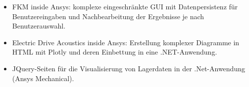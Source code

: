 \documentclass[10pt,a4paper,ragged2e,withhyper]{altacv}
\begin{document}
\begin{paracol}{2}
\begin{itemize}

\item FKM inside Ansys: komplexe eingeschränkte GUI mit Datenpersistenz für Benutzereingaben und Nachbearbeitung der Ergebnisse je nach Benutzerauswahl. 
\item Electric Drive Acoustics inside Ansys: Erstellung komplexer Diagramme in HTML mit Plotly und deren Einbettung in eine .NET-Anwendung.
\item JQuery-Seiten für die Visualisierung von Lagerdaten in der .Net-Anwendung (Ansys Mechanical).
\end{itemize}







\begin{comment}


\cvsection{A Day of My Life}

\hspace*{-1em}  %
\wheelchart{1.5cm}{0.5cm}{%
  10/13em/accent!30/Sleeping \& dreaming about work,
  25/9em/accent!60/Public resolving issues with Yahoo!\ investors,
  5/11em/accent!10/\footnotesize\\[1ex]New York \& San Francisco Ballet Jawbone board member,
  20/11em/accent!40/Spending time with family,
  5/8em/accent!20/\footnotesize Business development for Yahoo!\ after the Verizon acquisition,
  30/9em/accent/Showing Yahoo!\ \mbox{employees} that their work has meaning,
  5/8em/accent!20/Baking cupcakes
}



\end{comment}
\end{paracol}
\end{document}
